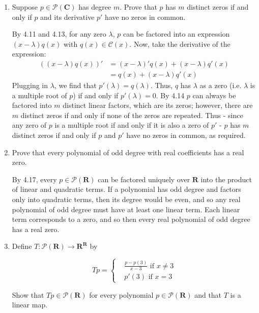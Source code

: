 \documentclass{book}
\begin{document}
\begin{enumerate}
\item Suppose \(p \in \mathcal{P}(\textbf{C})\) has degree \(m\).  Prove that \(p\) has \(m\) distinct zeros if and only if \(p\) and its derivative \(p'\) have no zeros in common.

By 4.11 and 4.13, for any zero \(\lambda\), \(p\) can be factored into an expression \((x-\lambda)q(x)\) with \(q(x) \in \mathcal{C}(x)\).  Now, take the derivative of the expression:
\begin{align*}
((x-\lambda)q(x))' &= (x-\lambda)'q(x)+(x-\lambda)q'(x) \\
&= q(x)+(x-\lambda)q'(x)
\end{align*}
Plugging in \(\lambda\), we find that \(p'(\lambda) = q(\lambda)\).  Thus, \(q\) has \(\lambda\) as a zero (i.e. \(\lambda\) is a multiple root of \(p\)) if and only if \(p'(\lambda)=0\).  By 4.14 \(p\) can always be factored into \(m\) distinct linear factors, which are its zeros; however, there are \(m\) distinct zeros if and only if none of the zeros are repeated.  Thus - since any zero of \(p\) is a multiple root if and only if it is also a zero of \(p'\) - \(p\) has \(m\) distinct zeros if and only if \(p\) and \(p'\) have no zeros in common, as required.

\item Prove that every polynomial of odd degree with real coefficients has a real zero.

By 4.17, every \(p \in \mathcal{P}(\textbf{R})\) can be factored uniquely over \(\textbf{R}\) into the product of linear and quadratic terms.  If a polynomial has odd degree and factors only into quadratic terms, then its degree would be even, and so any real polynomial of odd degree must have at least one linear term.  Each linear term corresponds to a zero, and so then every real polynomial of odd degree has a real zero.

\item Define \(T: \mathcal{P}(\textbf{R}) \rightarrow \textbf{R}^{\textbf{R}}\) by

\begin{equation*}
    Tp = 
    \begin{cases}
        & \frac{p - p(3)}{x - 3} \textrm{ if } x \neq 3 \\
        & p'(3) \textrm{ if } x = 3
    \end{cases}
\end{equation*}

Show that \(Tp \in \mathcal{P}(\textbf{R})\) for every polynomial \(p \in \mathcal{P}(\textbf{R})\) and that \(T\) is a linear map.


\end{enumerate}
\end{document}
